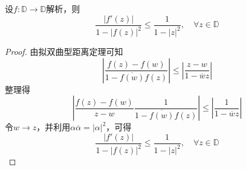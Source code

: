\begin{theorem}

    设$f: \mathbb{D} \to \mathbb{D}$解析，则
    $$\dfrac{|f'(z)|}{1 - |f(z)|^2} \leq \dfrac{1}{1 - |z|^2}, \quad \forall z \in \mathbb{D}$$

\end{theorem}

\begin{proof}
    
    由拟双曲型距离定理可知
    $$\left| \dfrac{f(z) - f(w)}{1 - \overline{f(w)}f(z)} \right| \leq \left| \dfrac{z - w}{1 - \overline{w}z} \right|$$
    整理得
    $$\left| \dfrac{f(z) - f(w)}{z - w} \dfrac{1}{1 - \overline{f(w)}f(z)} \right| \leq \left| \dfrac{1}{1 - \overline{w}z} \right|$$
    令$w \to z$，并利用$\alpha \overline{\alpha} = | \alpha|^2$，可得
    $$\dfrac{|f'(z)|}{1 - |f(z)|^2} \leq \dfrac{1}{1 - |z|^2}, \quad \forall z \in \mathbb{D}$$
    
\end{proof}
